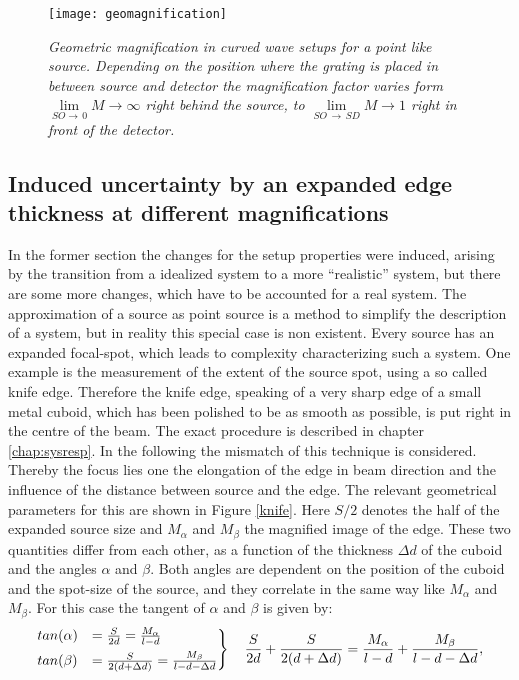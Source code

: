 \begin{figure}[h]
	\begin{center}
		\texttt{[image: geomagnification]}
	\end{center}
	\caption[Geometric magnification in curved wave setups]{\textit{Geometric magnification in curved wave setups for a point like source. Depending on the position where the grating is placed in between source and detector the magnification factor varies form $\lim\limits_{SO \rightarrow\, 0}{M \rightarrow \infty}$ right behind the source, to $\lim\limits_{SO\, \rightarrow\, SD}{M \rightarrow 1}$ right in front of the detector.}}
	\label{geomag}
\end{figure} 
\subsection{Induced uncertainty by an expanded edge thickness at different magnifications}\label{subsec:weth}
In the former section the changes for the setup properties were induced, arising by the transition from a idealized system to a more \enquote{realistic} system, but there are some more changes, which have to be accounted for a real system. The approximation of a source as point source is a method to simplify the description of a system, but in reality this special case is non existent. Every source has an expanded focal-spot, which leads to complexity characterizing such a system. One example is the measurement of the extent of the source spot, using a so called knife edge. Therefore the knife edge, speaking of a very sharp edge of a small metal cuboid, which has been polished to be as smooth as possible, is put right in the centre of the beam. The exact procedure is described in chapter \ref{chap:sysresp}. In the following the mismatch of this technique is considered. Thereby the focus lies one the elongation of the edge in beam direction and the influence of the distance between source and the edge. The relevant geometrical parameters for this are shown in Figure \ref{knife}. Here $S/2$ denotes the half of the expanded source size and $M_{\alpha}$ and $M_{\beta}$ the magnified image of the edge. These two quantities differ from each other, as a function of the thickness $\Delta d $ of the cuboid and the angles $\alpha$ and $\beta$. Both angles are dependent on the position of the cuboid and the spot-size of the source, and they correlate in the same way like $M_{\alpha}$ and $M_{\beta}$. For this case the tangent of $\alpha$ and $\beta$ is given by:
\begin{equation} \label{tan}
\begin{rcases} 
tan(\alpha) &= \frac{S}{2d} = \frac{M_{\alpha}}{l-d} \\
tan(\beta) &= \frac{S}{2(d + \Delta d)} = \frac{M_{\beta}}{l-d-\Delta d} 	
\end{rcases} \quad \frac{S}{2d} +\frac{S}{2(d + \Delta d)} = \frac{M_{\alpha}}{l -d} + \frac{M_{\beta}}{l -d- \Delta d}, 
\end{equation}
